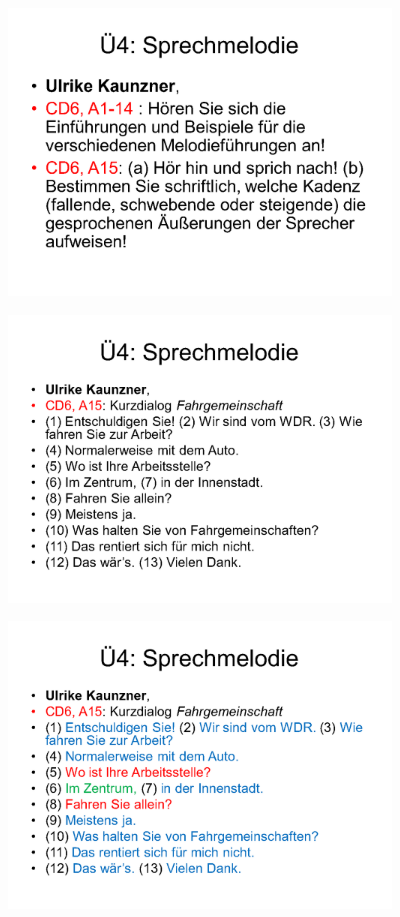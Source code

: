 \documentclass[
  letterpaper,
]{scrbook}
\begin{document}
\includegraphics[width=4in,height=\textheight]{./pictures/sprachlabor/Phonetikuebungen_S01_Page10.png}

\includegraphics[width=4in,height=\textheight]{./pictures/sprachlabor/Phonetikuebungen_S01_Page11.png}

\includegraphics[width=4in,height=\textheight]{./pictures/sprachlabor/Phonetikuebungen_S01_Page12.png}
\end{document}
